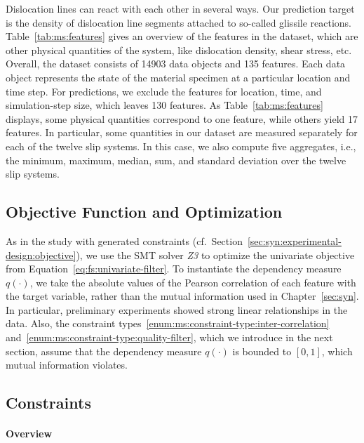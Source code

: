 Dislocation lines can react with each other in several ways.
Our prediction target is the density of dislocation line segments attached to so-called glissile reactions.
Table~\ref{tab:ms:features} gives an overview of the features in the dataset, which are other physical quantities of the system, like dislocation density, shear stress, etc.
Overall, the dataset consists of 14903 data objects and 135 features.
Each data object represents the state of the material specimen at a particular location and time step.
For predictions, we exclude the features for location, time, and simulation-step size, which leaves 130 features.
As Table~\ref{tab:ms:features} displays, some physical quantities correspond to one feature, while others yield 17 features.
In particular, some quantities in our dataset are measured separately for each of the twelve slip systems.
In this case, we also compute five aggregates, i.e., the minimum, maximum, median, sum, and standard deviation over the twelve slip systems.

\subsection{Objective Function and Optimization}
\label{sec:ms:experimental-design:objective}

As in the study with generated constraints (cf.~Section~\ref{sec:syn:experimental-design:objective}), we use the SMT solver \emph{Z3} \cite{bjorner2015nuz, deMoura2008z3} to optimize the univariate objective from Equation~\ref{eq:fs:univariate-filter}.
To instantiate the dependency measure~$q(\cdot)$, we take the absolute values of the Pearson correlation of each feature with the target variable, rather than the mutual information used in Chapter~\ref{sec:syn}.
In particular, preliminary experiments showed strong linear relationships in the data.
Also, the constraint types~\ref{enum:ms:constraint-type:inter-correlation} and~\ref{enum:ms:constraint-type:quality-filter}, which we introduce in the next section, assume that the dependency measure $q(\cdot)$ is bounded to $[0, 1]$, which mutual information violates.

\subsection{Constraints}
\label{sec:ms:experimental-design:constraints}

\paragraph{Overview}

